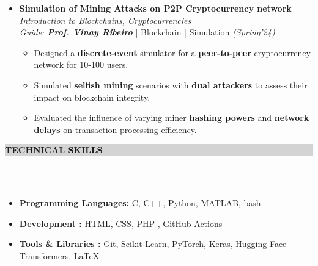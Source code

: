 \documentclass[a4paper,10.5pt]{article}
\newcommand{\lsep}{-0.5cm}
\newcommand{\resheading}[1]{{\small \colorbox{lightgray}{\begin{minipage}{0.975\textwidth}{\textbf{#1 \vphantom{p\^{E}}}}\end{minipage}}}}
\begin{document}
\begin{itemize}[noitemsep,nolistsep]
\item \textbf{Simulation of Mining Attacks on P2P Cryptocurrency network}  \hfill {\emph{Introduction to Blockchains, Cryptocurrencies}}\\
\emph{Guide: \textbf{Prof. Vinay Ribeiro}} | Blockchain | Simulation  \hfill
\emph{(Spring'24)}
\vspace{0.1cm}
\begin{itemize}[noitemsep,nolistsep]
    \item Designed a \textbf{discrete-event} simulator for a \textbf{peer-to-peer} cryptocurrency network for 10-100 users.
    \vspace{0.07cm}
    \item Simulated \textbf{selfish mining} scenarios with \textbf{dual attackers} to assess their impact on blockchain integrity.
    \vspace{0.07cm}
    \item Evaluated the influence of varying miner \textbf{hashing powers} and \textbf{network delays} on transaction processing efficiency.
\end{itemize}
\vspace{0.15cm}
\end{itemize}

\resheading{\textbf{ TECHNICAL SKILLS}} \\[\lsep] \\[-0.4cm]
\vspace{0.1cm}
\begin{itemize}
    \item \textbf{Programming Languages:} C, C++, Python, MATLAB, bash
    \vspace{-0.19cm}
    
    \item \textbf{Development :} HTML, CSS, PHP , GitHub Actions
    \vspace{-0.19cm}
    
    \item \textbf{Tools \& Libraries :} Git, Scikit-Learn, PyTorch, Keras, Hugging Face Transformers, \LaTeX
    \vspace{-0.10cm}
\end{itemize}
    
\end{document}
